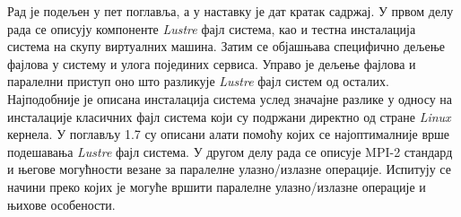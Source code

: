 Рад је подељен у пет поглавља, а у наставку је дат кратак садржај. У првом делу рада се описују компоненте \textit{Lustre} фајл система, као и тестна инсталација система на скупу виртуалних машина. Затим се објашњава специфично дељење фајлова у систему и улога појединих сервиса. Управо је дељење фајлова и паралелни приступ оно што разликује \textit{Lustre} фајл систем од осталих. Најподобније је описана инсталација система услед значајне разлике у односу на инсталације класичних фајл система који су подржани директно од стране \textit{Linux} кернела. У поглављу 1.7 су описани алати помоћу којих се  најоптималније врше подешавања \textit{Lustre} фајл система. 
У другом делу рада се описује MPI-2 стандард и његове могућности везане за паралелне улазно/излазне операције. Испитују се начини преко којих је могуће вршити паралелне улазно/излазне операције и њихове особености.

\newpage
